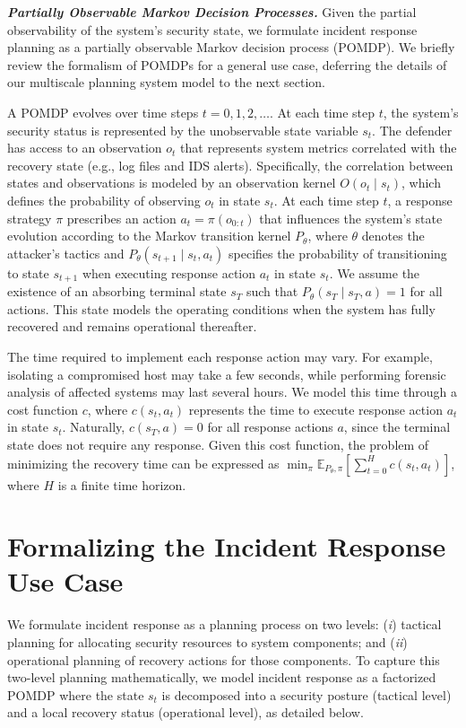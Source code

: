 \documentclass[runningheads,10pt]{llncs}
\begin{document}
\noindent\textit{\textbf{Partially Observable Markov Decision Processes.}}
Given the partial observability of the system's security state, we formulate incident response planning as a partially observable Markov decision process (POMDP). We briefly review the formalism of POMDPs for a general use case, deferring the details of our multiscale planning system model to the next section.

A POMDP evolves over time steps $ t=0,1,2, \ldots$. At each time step $t$, the system's security status is represented by the unobservable state variable $s_t$. The defender has access to an observation $o_t$ that represents system metrics correlated with the recovery state (e.g., log files and IDS alerts). Specifically, the correlation between states and observations is modeled by an observation kernel $O(o_t \mid s_t)$, which defines the probability of observing $o_t$ in state $s_t$. At each time step $t$, a response strategy $\pi$ prescribes an action $a_t=\pi(o_{0:t})$ that influences the system's state evolution according to the Markov transition kernel $P_\theta$, where $\theta$ denotes the attacker's tactics and $P_\theta(s_{t+1}\mid s_t, a_t)$ specifies the probability of transitioning to state $s_{t+1}$ when executing response action $a_t$ in state $s_t$. We assume the existence of an absorbing terminal state $s_T$ such that $P_\theta(s_T\mid s_T, a)=1$ for all actions. This state models the operating conditions when the system has fully recovered and remains operational thereafter.

The time required to implement each response action may vary. For example, isolating a compromised host may take a few seconds, while performing forensic analysis of affected systems may last several hours. We model this time through a cost function $c$, where $c(s_t, a_t)$ represents the time to execute response action $a_t$ in state $s_t$. Naturally, $c(s_T, a)=0$ for all response actions $a$, since the terminal state does not require any response. Given this cost function, the problem of minimizing the recovery time can be expressed as $\min_{\pi}\mathbb{E}_{P_\theta,\pi}\left[ \sum_{t=0}^H c(s_t,a_t)\right]$, where $H$ is a finite time horizon. 

\section{Formalizing the Incident Response Use Case}\label{sec:system_model}

We formulate incident response as a planning process on two levels: (\textit{i}) tactical planning for allocating security resources to system components; and (\textit{ii}) operational planning of recovery actions for those components. To capture this two-level planning mathematically, we model incident response as a factorized POMDP where the state $s_t$ is decomposed into a security posture (tactical level) and a local recovery status (operational level), as detailed below.
\end{document}
